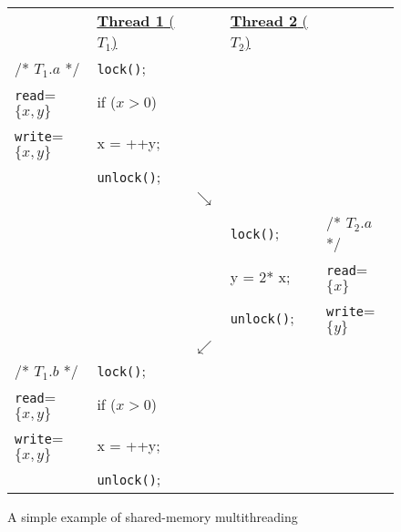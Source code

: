 \begin{figure}[t]
\centering
\myfontsize
{
\begin{tabular}
{m{1.5cm} m{1.4cm} m{0.1cm} m{1.8cm} m{1.2cm}}
&\underline{{\bf Thread 1} ($T_1$)} & & \underline{ {\bf Thread 2}  ($T_2$)} &\\ 
 

/* \underline{$T_{1}.a$} */ & {\tt lock()}; && &\\

 {\tt read}=$\{x, y\}$  &if ($x > 0$) && &\\
 {\tt write}=$\{x, y\}$ &  x = ++y;&& &\\
 & {\tt unlock()};&& &\\
        &  &  $\searrow$ & & \\
   

&&  & {\tt lock()}; &  /* \underline{$T_{2}.a$ }*/\\
&&  & y = 2* x;    & {\tt read}=$\{x\}$  \\
&  &  & {\tt unlock()}; &  {\tt write}=$\{y\}$ \\  

        &  &  $\swarrow$ & & \\
/* \underline{$T_{1}.b$} */ & {\tt lock()}; && &\\

 {\tt read}=$\{x, y\}$  &if ($x > 0$) && &\\
 {\tt write}=$\{x, y\}$ &  x = ++y;&& &\\
 & {\tt unlock()};&& &\\

\end{tabular}
}


\caption{ A simple example of shared-memory multithreading}
\label{fig:simple-example}
\end{figure}
